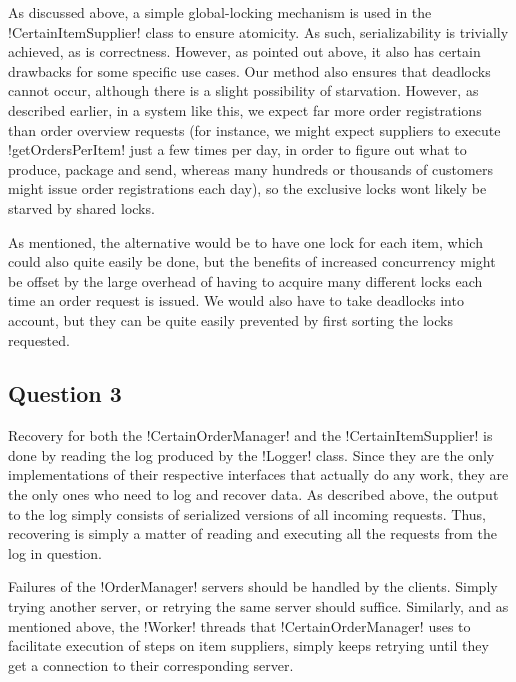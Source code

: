 \documentclass[a4paper, 12pt]{article}
\begin{document}


As discussed above, a simple global-locking mechanism is used in the
!CertainItemSupplier! class to ensure atomicity. As such,
serializability is trivially achieved, as is correctness. However, as
pointed out above, it also has certain drawbacks for some specific use
cases. Our method also ensures that deadlocks cannot occur, although
there is a slight possibility of starvation. However, as described
earlier, in a system like this, we expect far more order registrations
than order overview requests (for instance, we might expect suppliers
to execute !getOrdersPerItem! just a few times per day, in order to
figure out what to produce, package and send, whereas many hundreds or
thousands of customers might issue order registrations each day), so
the exclusive locks wont likely be starved by shared locks.

As mentioned, the alternative would be to have one lock for each item,
which could also quite easily be done, but the benefits of increased
concurrency might be offset by the large overhead of having to acquire
many different locks each time an order request is
issued. We would also have to take deadlocks into account, but they
can be quite easily prevented by first sorting the locks requested.

\subsection*{Question 3}


Recovery for both the !CertainOrderManager! and the
!CertainItemSupplier! is done by reading the log produced by the
!Logger! class. Since they are the only implementations of their
respective interfaces that actually do any work, they are the only
ones who need to log and recover data. As described above, the output
to the log simply consists of serialized versions of all incoming
requests. Thus, recovering is simply a matter of reading and executing
all the requests from the log in question.

Failures of the !OrderManager! servers should be handled by the
clients. Simply trying another server, or retrying the same server
should suffice. Similarly, and as mentioned above, the !Worker!
threads that !CertainOrderManager! uses to facilitate execution of
steps on item suppliers, simply keeps retrying until they get a
connection to their corresponding server.
\end{document}
